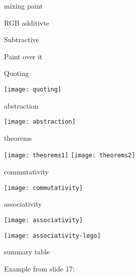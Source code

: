 mixing paint

\begin{center}
\end{center}

RGB additivte

\begin{center}
\end{center}

Subtractive

\begin{center}
\end{center}

Paint over it

\begin{center}
\end{center}

Quoting

\texttt{[image: quoting]}


abstraction

\texttt{[image: abstraction]}

theorems

\texttt{[image: theorems1]}
\texttt{[image: theorems2]}

commutativity

\texttt{[image: commutativity]}


associativity

\texttt{[image: associativity]}

\texttt{[image: associativity-lego]}

summary table

\begin{center}
\end{center}
%

Example from slide 17:



